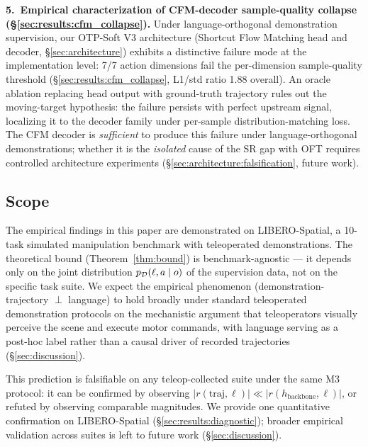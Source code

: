 \textbf{5.~Empirical characterization of CFM-decoder sample-quality collapse
(\S\ref{sec:results:cfm_collapse}).} Under language-orthogonal demonstration supervision,
our OTP-Soft V3 architecture (Shortcut Flow Matching head and decoder,
\S\ref{sec:architecture}) exhibits a distinctive failure mode at the implementation level:
7/7 action dimensions fail the per-dimension sample-quality threshold
(\S\ref{sec:results:cfm_collapse}, L1/std ratio 1.88 overall). An oracle ablation replacing
head output with ground-truth trajectory rules out the moving-target hypothesis: the
failure persists with perfect upstream signal, localizing it to the decoder family under
per-sample distribution-matching loss. The CFM decoder is \emph{sufficient} to produce
this failure under language-orthogonal demonstrations; whether it is the \emph{isolated}
cause of the SR gap with OFT requires controlled architecture experiments
(\S\ref{sec:architecture:falsification}, future work).

\subsection{Scope}
\label{sec:intro:scope}

The empirical findings in this paper are demonstrated on LIBERO-Spatial, a 10-task
simulated manipulation benchmark with teleoperated demonstrations. The theoretical bound
(Theorem~\ref{thm:bound}) is benchmark-agnostic --- it depends only on the joint
distribution $p_{\mathcal{D}}(\ell, a \mid o)$ of the supervision data, not on the specific task
suite. We expect the empirical phenomenon (demonstration-trajectory $\perp$ language) to
hold broadly under standard teleoperated demonstration protocols on the mechanistic
argument that teleoperators visually perceive the scene and execute motor commands, with
language serving as a post-hoc label rather than a causal driver of recorded trajectories
(\S\ref{sec:discussion}).

This prediction is falsifiable on any teleop-collected suite under the same M3 protocol:
it can be confirmed by observing $\lvert r(\text{traj}, \ell) \rvert \ll \lvert
r(h_{\text{backbone}}, \ell) \rvert$, or refuted by observing comparable magnitudes. We
provide one quantitative confirmation on LIBERO-Spatial (\S\ref{sec:results:diagnostic});
broader empirical validation across suites is left to future work (\S\ref{sec:discussion}).

